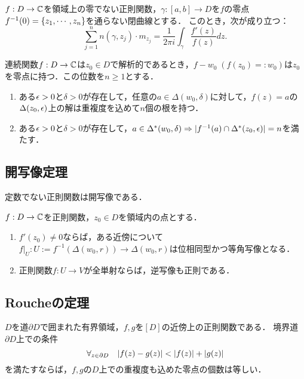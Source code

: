 \documentclass[uplatex, dvipdfmx]{jsreport}
\begin{document}
\begin{theorem}[偏角の原理]
    $f:D\to\mathbb{C}$を領域上の零でない正則関数，$\gamma:[a,b]\to D$を$f$の零点$f^{-1}(0)=\left\{z_1,\cdots,z_n\right\}$を通らない閉曲線とする．
    このとき，次が成り立つ：
    \[\sum_{j=1}^nn(\gamma,z_j)\cdot m_{z_j}=\frac{1}{2\pi i}\int_\gamma\frac{f'(z)}{f(z)}dz.\]
\end{theorem}

\begin{corollary}[零点の近傍での対応]
    連続関数$f:D\to\mathbb{C}$は$z_0\in D$で解析的であるとき，$f-w_0\;(f(z_0)=:w_0)$は$z_0$を零点に持つ．この位数を$n\ge1$とする．
    \begin{enumerate}
        \item ある$\epsilon>0$と$\delta>0$が存在して，任意の$a\in\Delta(w_0,\delta)$に対して，$f(z)=a$の$\Delta(z_0,\epsilon)$上の解は重複度を込めて$n$個の根を持つ．
        \item ある$\epsilon>0$と$\delta>0$が存在して，$a\in\Delta^*(w_0,\delta)\Rightarrow\lvert f^{-1}(a)\cap\Delta^*(z_0,\epsilon)\rvert=n$を満たす．
    \end{enumerate}
\end{corollary}

\subsection{開写像定理}

\begin{corollary}
    定数でない正則関数は開写像である．
\end{corollary}

\begin{corollary}
    $f:D\to \mathbb{C}$を正則関数，$z_0\in D$を領域内の点とする．
    \begin{enumerate}
        \item $f'(z_0)\ne0$ならば，ある近傍について$f|_{U}:U:=f^{-1}(\Delta(w_0,r))\to \Delta(w_0,r)$は位相同型かつ等角写像となる．
        \item 正則関数$f:U\to V$が全単射ならば，逆写像も正則である．
    \end{enumerate}
\end{corollary}

\subsection{Roucheの定理}

\begin{theorem}[Rouche]
    $D$を道$\partial D$で囲まれた有界領域，$f,g$を$[D]$の近傍上の正則関数である．
    境界道$\partial D$上での条件
    \[\forall_{z\in\partial D}\quad\lvert f(z)-g(z)\rvert<\lvert f(z)\rvert+\lvert g(z)\rvert\]
    を満たすならば，$f,g$の$D$上での重複度も込めた零点の個数は等しい．
\end{theorem}
\end{document}
